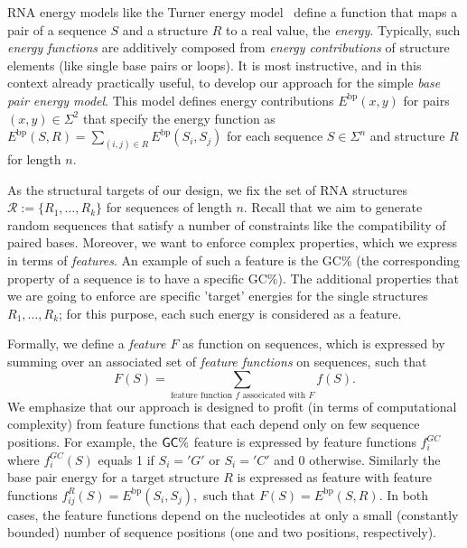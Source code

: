 \documentclass{bmcart}
\newcommand{\R}{\mathcal{R}}
\newcommand{\EbpSym}{E^{\textrm{bp}}}
\newcommand{\Def}[1]{\emph{#1}}
\newcommand{\Nuc}[1]{{\sf #1}}
\newcommand{\Cb}{\Nuc{C}}
\newcommand{\Gb}{\Nuc{G}}
\newcommand{\GCb}{\Gb\Cb}
\newcommand{\citep}[1]{\cite{#1}}
\begin{document}
RNA energy models like the Turner energy model~\citep{Turner2009} define a function that maps a pair of a sequence $S$ and a structure $R$ to a real value, the \Def{energy}. 
Typically, such \Def{energy functions} are additively composed from \Def{energy contributions} of structure elements (like single base pairs or loops). It is most instructive, and in this context already practically useful, to develop our approach for the simple \Def{base pair energy model}. This model defines energy contributions $\EbpSym(x,y)$ for pairs $(x,y)\in\Sigma^2$ that specify the energy function as
$
\EbpSym(S,R) = \sum_{(i,j)\in R} \EbpSym(S_i,S_j)
$
for each sequence $S\in\Sigma^n$ and structure $R$ for length $n$.

As the structural targets of our design, we fix the set of RNA structures
$\R:=\{R_1, \dots, R_k\}$ for sequences of length $n$.
Recall that we aim to generate random sequences that satisfy a number of constraints like the compatibility of paired bases. Moreover, we want to enforce complex properties, which we express in terms of \emph{features}. An example of such a feature is the \GCb\% (the corresponding property of a sequence is to have a specific \GCb\%). The additional properties that we are going to enforce are specific 'target' energies for the single structures $R_1, \dots, R_k$; for this purpose, each such energy is considered as a feature.

Formally, we define a \Def{feature $F$} as function on sequences, which is expressed by summing over an associated set of \Def{feature functions} on sequences, such that
$$
F(S) = \sum_{\text{feature function $f$ associcated with $F$}} f(S).
$$
We emphasize that our approach is designed to profit (in terms of computational complexity) from feature functions that each depend only on few sequence positions. For example, the $\GCb\%$ feature is expressed by feature functions $f^{GC}_i$ where $f^{GC}_i(S)$ equals 1 if $S_i='G'$ or $S_i='C'$ and 0 otherwise. Similarly the base pair energy for a target structure $R$ is expressed as feature with feature functions $f^R_{ij}(S)=\EbpSym(S_i,S_j),$ such that $F(S)=\EbpSym(S,R)$. In both cases, the feature functions depend on the nucleotides at only a small (constantly bounded) number of sequence positions (one and two positions, respectively).
 
\end{document}
